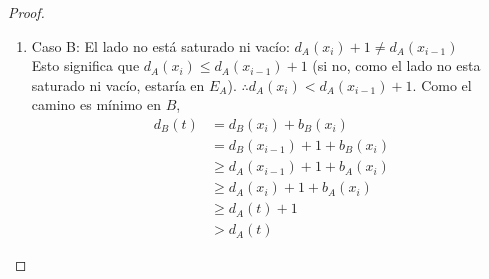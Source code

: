 \begin{proof}
\begin{enumerate}
\begin{enumerate}
    \item Caso B: El lado no está saturado ni vacío: $d_A(x_i) + 1 \neq d_A(x_{i-1})$\\
    Esto significa que $d_A(x_{i}) \le d_A(x_{i-1}) + 1$ (si no, como el lado no esta saturado ni vacío, estaría en $E_A$).
    $\therefore d_A(x_i) < d_A(x_{i-1}) + 1$. Como el camino es mínimo en $B$,
    \begin{align}
        d_B(t)
        &= d_B(x_i) + b_B(x_i)\\
        &= d_B(x_{i-1}) + 1 + b_B(x_i)\\
        &\ge d_A(x_{i-1}) + 1 + b_A(x_i)\\
        &\ge d_A(x_i) + 1 + b_A(x_i)\\
        &\ge d_A(t) + 1\\
        &> d_A(t)
    \end{align}
    \end{enumerate}
\end{enumerate}
\end{proof}

